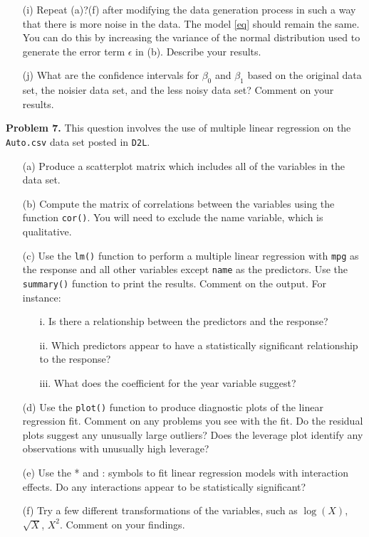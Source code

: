 \documentclass[12pt]{report}
\begin{document}
\begin{itemize}
\item[(i) ] Repeat (a)?(f) after modifying the data generation process in such a way that there is more noise in the data. The model \eqref{eq} should remain the same. You can do this by increasing the variance of the normal distribution used to generate the error term $\epsilon$ in (b). Describe your results.
\item[(j) ] What are the confidence intervals for $\beta_0$ and $\beta_1$ based on the original data set, the noisier data set, and the less noisy data set? Comment on your results.
\end{itemize}

\noindent
{\bf Problem 7.} This question involves the use of multiple linear regression on the {\tt Auto.csv} data set posted in {\tt D2L}.
\begin{itemize}
\item[(a) ] Produce a scatterplot matrix which includes all of the variables in the data set.
\item[(b) ] Compute the matrix of correlations between the variables using the function {\tt cor()}. You will need to exclude the name variable, which is qualitative.
\item[(c) ] Use the {\tt lm()} function to perform a multiple linear regression with {\tt mpg} as the response and all other variables except {\tt name} as the predictors. Use the {\tt summary()} function to print the results. Comment on the output. For instance:
\begin{itemize}
\item[i. ] Is there a relationship between the predictors and the response?
\item[ii. ] Which predictors appear to have a statistically significant relationship to the response?
\item[iii. ] What does the coefficient for the year variable suggest?
\end{itemize}
\item[(d) ] Use the {\tt plot()} function to produce diagnostic plots of the linear regression fit. Comment on any problems you see with the fit. Do the residual plots suggest any unusually large outliers? Does the leverage plot identify any observations with unusually high leverage?
\item[(e) ] Use the * and : symbols to fit linear regression models with interaction effects. Do any interactions appear to be statistically significant?
\item[(f) ] Try a few different transformations of the variables, such as $\log(X)$, $\sqrt{X}$, $X^2$. Comment on your findings.
\end{itemize}
 
\end{document}
